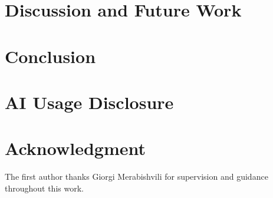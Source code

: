 \documentclass[conference,a4paper]{IEEEtran}
\begin{document}
\section{Discussion and Future Work}


\section{Conclusion}


\section*{AI Usage Disclosure}


\section*{Acknowledgment}
The first author thanks Giorgi Merabishvili for supervision and guidance throughout this work.



\end{document}
